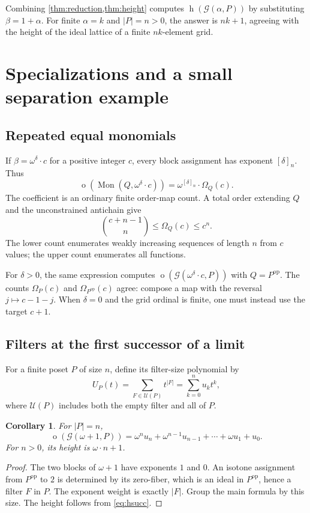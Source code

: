 \documentclass[11pt,a4paper]{article}
\newtheorem{corollary}[corollary]{Corollary}
\theoremstyle{definition}
\theoremstyle{remark}
\newcommand{\Mon}{\operatorname{Mon}}
\newcommand{\Grid}{\mathcal{G}}
\newcommand{\otype}{\operatorname{o}}
\newcommand{\height}{\operatorname{h}}
\newcommand{\op}{\mathrm{op}}
\newcommand{\Ups}{\mathcal{U}}
\newcommand{\Nrep}[2]{\left[#1\right]_{#2}}
\begin{document}
Combining \cref{thm:reduction,thm:height} computes
$\height(\Grid(\alpha,P))$ by substituting $\beta=1+\alpha$. For finite
$\alpha=k$ and $|P|=n>0$, the answer is $nk+1$, agreeing with the height
of the ideal lattice of a finite $nk$-element grid.

\section{Specializations and a small separation example}

\subsection{Repeated equal monomials}
If $\beta=\omega^\delta\cdot c$ for a positive integer $c$, every block
assignment has exponent $\Nrep{\delta}{n}$. Thus
\begin{equation}\label{eq:equal}
 \otype(\Mon(Q,\omega^\delta\cdot c))
 =\omega^{\Nrep{\delta}{n}}\cdot\Omega_Q(c).
\end{equation}
The coefficient is an ordinary finite order-map count. A total order
extending $Q$ and the unconstrained antichain give
\[
 \binom{c+n-1}{n}\leq\Omega_Q(c)\leq c^n.
\]
The lower count enumerates weakly increasing sequences of length $n$ from
$c$ values; the upper count enumerates all functions.

For $\delta>0$, the same expression computes
$\otype(\Grid(\omega^\delta\cdot c,P))$ with $Q=P^{\op}$.
The counts $\Omega_P(c)$ and $\Omega_{P^{\op}}(c)$ agree: compose a map
with the reversal $j\mapsto c-1-j$. When $\delta=0$ and the grid ordinal
is finite, one must instead use the target $c+1$.

\subsection{Filters at the first successor of a limit}
For a finite poset $P$ of size $n$, define its filter-size polynomial by
\begin{equation}\label{eq:filterpoly}
 U_P(t)=\sum_{F\in\Ups(P)}t^{|F|}
       =\sum_{k=0}^n u_k t^k,
\end{equation}
where $\Ups(P)$ includes both the empty filter and all of $P$.

\begin{corollary}\label{cor:omegaone}
For $|P|=n$,
\begin{equation}\label{eq:omegaone}
 \boxed{\otype(\Grid(\omega+1,P))
 =\omega^n u_n+\omega^{n-1}u_{n-1}+\cdots+\omega u_1+u_0.}
\end{equation}
For $n>0$, its height is $\omega\cdot n+1$.
\end{corollary}
\begin{proof}
The two blocks of $\omega+1$ have exponents $1$ and $0$. An isotone
assignment from $P^{\op}$ to $2$ is determined by its zero-fiber, which
is an ideal in $P^{\op}$, hence a filter $F$ in $P$. The exponent weight
is exactly $|F|$. Group the main formula by this size. The height follows
from \eqref{eq:hsucc}.
\end{proof}
\end{document}
